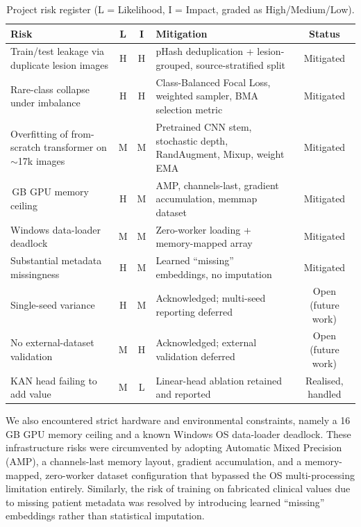 \begin{table}[H]
\centering
\caption{Project risk register (L = Likelihood, I = Impact, graded as High/Medium/Low).}
\label{tab:risk-register}
\scriptsize
\begin{tabularx}{\textwidth}{>{\raggedright\arraybackslash}Xcc>{\raggedright\arraybackslash}Xc}
\toprule
Risk & L & I & Mitigation & Status \\
\midrule
Train/test leakage via duplicate lesion images & H & H & pHash deduplication + lesion-grouped, source-stratified split & Mitigated \\
Rare-class collapse under imbalance & H & H & Class-Balanced Focal Loss, weighted sampler, BMA selection metric & Mitigated \\
Overfitting of from-scratch transformer on $\sim$17k images & M & M & Pretrained CNN stem, stochastic depth, RandAugment, Mixup, weight EMA & Mitigated \\
16\,GB GPU memory ceiling & H & M & AMP, channels-last, gradient accumulation, memmap dataset & Mitigated \\
Windows data-loader deadlock & M & M & Zero-worker loading + memory-mapped array & Mitigated \\
Substantial metadata missingness & H & M & Learned ``missing'' embeddings, no imputation & Mitigated \\
Single-seed variance & H & M & Acknowledged; multi-seed reporting deferred & Open (future work) \\
No external-dataset validation & M & H & Acknowledged; external validation deferred & Open (future work) \\
KAN head failing to add value & M & L & Linear-head ablation retained and reported & Realised, handled \\
\bottomrule
\end{tabularx}
\end{table}

We also encountered strict hardware and environmental constraints, namely a 16\,GB GPU memory ceiling and a known Windows OS data-loader deadlock. These infrastructure risks were circumvented by adopting Automatic Mixed Precision (AMP), a channels-last memory layout, gradient accumulation, and a memory-mapped, zero-worker dataset configuration that bypassed the OS multi-processing limitation entirely. Similarly, the risk of training on fabricated clinical values due to missing patient metadata was resolved by introducing learned ``missing'' embeddings rather than statistical imputation. 

